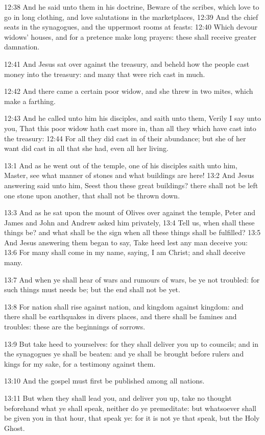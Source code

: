 12:38 And he said unto them in his doctrine, Beware of the scribes,
which love to go in long clothing, and love salutations in the
marketplaces, 12:39 And the chief seats in the synagogues, and the
uppermost rooms at feasts: 12:40 Which devour widows' houses, and for
a pretence make long prayers: these shall receive greater damnation.

12:41 And Jesus sat over against the treasury, and beheld how the
people cast money into the treasury: and many that were rich cast in
much.

12:42 And there came a certain poor widow, and she threw in two mites,
which make a farthing.

12:43 And he called unto him his disciples, and saith unto them,
Verily I say unto you, That this poor widow hath cast more in, than
all they which have cast into the treasury: 12:44 For all they did
cast in of their abundance; but she of her want did cast in all that
she had, even all her living.

13:1 And as he went out of the temple, one of his disciples saith unto
him, Master, see what manner of stones and what buildings are here!
13:2 And Jesus answering said unto him, Seest thou these great
buildings?  there shall not be left one stone upon another, that shall
not be thrown down.

13:3 And as he sat upon the mount of Olives over against the temple,
Peter and James and John and Andrew asked him privately, 13:4 Tell us,
when shall these things be? and what shall be the sign when all these
things shall be fulfilled?  13:5 And Jesus answering them began to
say, Take heed lest any man deceive you: 13:6 For many shall come in
my name, saying, I am Christ; and shall deceive many.

13:7 And when ye shall hear of wars and rumours of wars, be ye not
troubled: for such things must needs be; but the end shall not be yet.

13:8 For nation shall rise against nation, and kingdom against
kingdom: and there shall be earthquakes in divers places, and there
shall be famines and troubles: these are the beginnings of sorrows.

13:9 But take heed to yourselves: for they shall deliver you up to
councils; and in the synagogues ye shall be beaten: and ye shall be
brought before rulers and kings for my sake, for a testimony against
them.

13:10 And the gospel must first be published among all nations.

13:11 But when they shall lead you, and deliver you up, take no
thought beforehand what ye shall speak, neither do ye premeditate: but
whatsoever shall be given you in that hour, that speak ye: for it is
not ye that speak, but the Holy Ghost.

